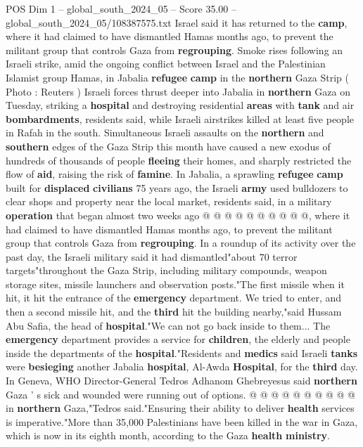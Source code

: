 \begin{textsample}{POS Dim 1 – global\_south\_2024\_05 – Score 35.00 – global\_south\_2024\_05/108387575.txt}  \label{ex:f1_pos_077}
Israel said it has returned to the \textbf{camp}, where it had claimed to have dismantled Hamas months ago, to prevent the militant group that controls Gaza from \textbf{regrouping}.
Smoke rises following an Israeli strike, amid the ongoing conflict between Israel and the Palestinian Islamist group Hamas, in Jabalia \textbf{refugee} \textbf{camp} in the \textbf{northern} Gaza Strip ( Photo : Reuters ) Israeli forces thrust deeper into Jabalia in \textbf{northern} Gaza on Tuesday, striking a \textbf{hospital} and destroying residential \textbf{areas} with \textbf{tank} and air \textbf{bombardments}, residents said, while Israeli airstrikes killed at least five people in Rafah in the south.
Simultaneous Israeli assaults on the \textbf{northern} and \textbf{southern} edges of the Gaza Strip this month have caused a new exodus of hundreds of thousands of people \textbf{fleeing} their homes, and sharply restricted the flow of \textbf{aid}, raising the risk of \textbf{famine}.
In Jabalia, a sprawling \textbf{refugee} \textbf{camp} built for \textbf{displaced} \textbf{civilians} 75 years ago, the Israeli \textbf{army} used bulldozers to clear shops and property near the local market, residents said, in a military \textbf{operation} that began almost two weeks ago @ @ @ @ @ @ @ @ @ @, where it had claimed to have dismantled Hamas months ago, to prevent the militant group that controls Gaza from \textbf{regrouping}.
In a roundup of its activity over the past day, the Israeli military said it had dismantled"about 70 terror targets"throughout the Gaza Strip, including military compounds, weapon storage sites, missile launchers and observation posts."The first missile when it hit, it hit the entrance of the \textbf{emergency} department.
We tried to enter, and then a second missile hit, and the \textbf{third} hit the building nearby,"said Hussam Abu Safia, the head of \textbf{hospital}."We can not go back inside to them...
The \textbf{emergency} department provides a service for \textbf{children}, the elderly and people inside the departments of the \textbf{hospital}."Residents and \textbf{medics} said Israeli \textbf{tanks} were \textbf{besieging} another Jabalia \textbf{hospital}, Al-Awda \textbf{Hospital}, for the \textbf{third} day.
In Geneva, WHO Director-General Tedros Adhanom Ghebreyesus said \textbf{northern} Gaza ' s sick and wounded were running out of options. @ @ @ @ @ @ @ @ @ @ in \textbf{northern} Gaza,"Tedros said."Ensuring their ability to deliver \textbf{health} services is imperative."More than 35,000 Palestinians have been killed in the war in Gaza, which is now in its eighth month, according to the Gaza \textbf{health} \textbf{ministry}.

\end{textsample}
